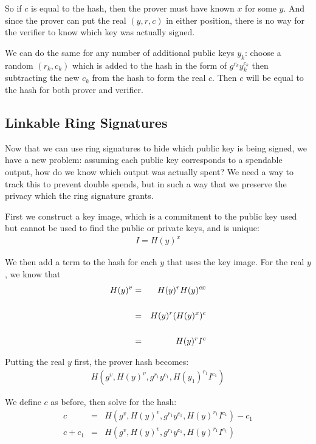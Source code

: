 \documentclass{article}
\begin{document}
So if $c$ is equal to the hash, then the prover must have known $x$ for some $y$.  And since the prover can put the real $(y,r,c)$ in either position, there is no way for the verifier to know which key was actually signed.

We can do the same for any number of additional public keys $y_k$: choose a random $(r_k,c_k)$ which is added to the hash in the form of $g^{r_k}y_k^{c_k}$ then subtracting the new $c_k$ from the hash to form the real $c$. Then $c$ will be equal to the hash for both prover and verifier.



\subsection{Linkable Ring Signatures}

Now that we can use ring signatures to hide which public key is being signed, we have a new problem: assuming each public key corresponds to a spendable output, how do we know which output was actually spent?  We need a way to track this to prevent double spends, but in such a way that we preserve the privacy which the ring signature grants.

First we construct a key image, which is a commitment to the public key used but cannot be used to find the public or private keys, and is unique:
\begin{eqnarray}
  I = H(y)^x
\end{eqnarray}

We then add a term to the hash for each $y$ that uses the key image.  For the real $y$, we know that
\begin{eqnarray}
  H(y)^v &=& H(y)^r H(y)^{cx}\\
  \cr &=& H(y)^r (H(y)^x)^c\\
  \cr &=& H(y)^r I^c
\end{eqnarray}

Putting the real $y$ first, the prover hash becomes:
\begin{eqnarray}
  H(g^v, H(y)^v, g^{r_1} y^{c_1}, H(y_1)^{r_1} I^{c_1})
\end{eqnarray}

We define $c$ as before, then solve for the hash:
\begin{eqnarray}
  c &=& H(g^v, H(y)^v, g^{r_1} y^{c_1}, H(y)^{r_1} I^{c_1}) - c_1\\
  c + c_1 &=& H(g^v, H(y)^v, g^{r_1} y^{c_1}, H(y)^{r_1} I^{c_1})
\end{eqnarray}
\end{document}
